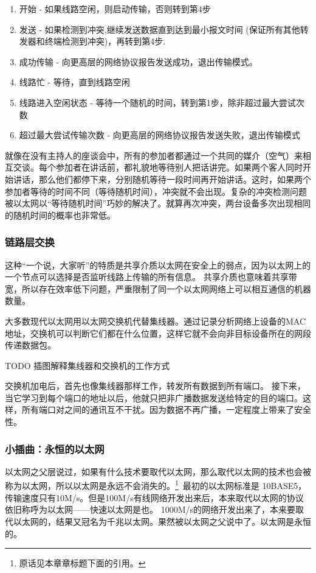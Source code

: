 \begin{enumerate}
\item     开始 - 如果线路空闲，则启动传输，否则转到第4步
\item     发送 - 如果检测到冲突,继续发送数据直到达到最小报文时间 (保证所有其他转发器和终端检测到冲突)，再转到第4步.
\item     成功传输 - 向更高层的网络协议报告发送成功，退出传输模式。
\item     线路忙 - 等待，直到线路空闲
\item     线路进入空闲状态 - 等待一个随机的时间，转到第1步，除非超过最大尝试次数
\item     超过最大尝试传输次数 - 向更高层的网络协议报告发送失败，退出传输模式
\end{enumerate}

就像在没有主持人的座谈会中，所有的参加者都通过一个共同的媒介（空气）来相互交谈。每个参加者在讲话前，都礼貌地等待别人把话讲完。如果两个客人同时开始讲话，那么他们都停下来，分别随机等待一段时间再开始讲话。这时，如果两个参加者等待的时间不同（等待随机时间），冲突就不会出现。复杂的冲突检测问题被以太网以“等待随机时间”巧妙的解决了。就算再次冲突，两台设备多次出现相同的随机时间的概率也非常低。

\subsubsection{链路层交换}

这种“一个说，大家听”的特质是共享介质以太网在安全上的弱点，因为以太网上的一个节点可以选择是否监听线路上传输的所有信息。
共享介质也意味着共享带宽，所以存在效率低下问题，严重限制了同一个以太网网络上可以相互通信的机器数量。

大多数现代以太网用以太网交换机代替集线器。通过记录分析网络上设备的MAC地址，交换机可以判断它们都在什么位置，这样它就不会向非目标设备所在的网段传递数据包。

TODO 插图解释集线器和交换机的工作方式 %

交换机加电后，首先也像集线器那样工作，转发所有数据到所有端口。
接下来，当它学习到每个端口的地址以后，他就只把非广播数据发送给特定的目的端口。这样，所有端口对之间的通讯互不干扰。因为数据不再广播，一定程度上带来了安全性。


\subsubsection*{小插曲：永恒的以太网}
以太网之父层说过，如果有什么技术要取代以太网，那么取代以太网的技术也会被称为以太网，所以以太网是永远不会消失的。\hspace{-0.5em}\footnote{原话见本章章标题下面的引用。}~最初的以太网标准是 10BASE5， 传输速度只有10M/s。但是100M/s有线网络开发出来后，本来取代以太网的协议依旧称呼为以太网——快速以太网是也。
1000M/s的网络开发出来了，本来要取代以太网的，结果又冠名为千兆以太网。果然被以太网之父说中了。以太网是永恒的。

